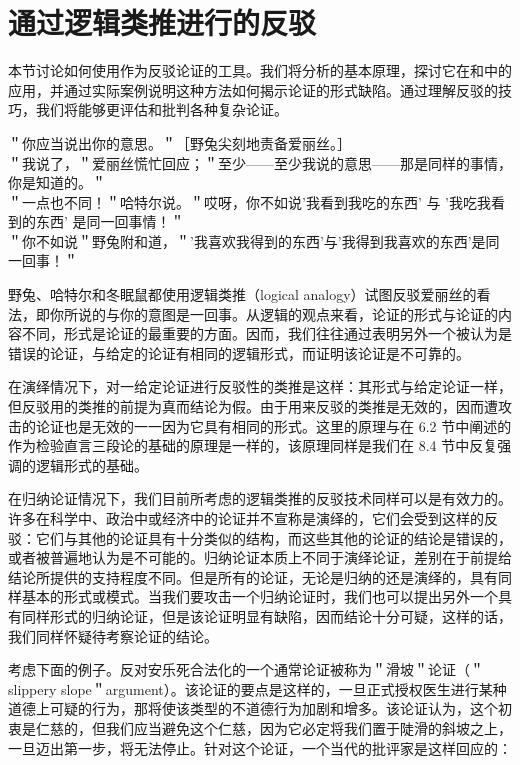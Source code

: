 \section{通过逻辑类推进行的反驳}

\begin{logicbox}[title=引言]
本节讨论如何使用作为反驳论证的工具。我们将分析的基本原理，探讨它在和中的应用，并通过实际案例说明这种方法如何揭示论证的形式缺陷。通过理解反驳的技巧，我们将能够更评估和批判各种复杂论证。
\end{logicbox}

＂你应当说出你的意思。＂［野兔尖刻地责备爱丽丝。］\\
＂我说了，＂爱丽丝慌忙回应；＂至少——至少我说的意思——那是同样的事情，你是知道的。＂\\
＂一点也不同！＂哈特尔说。＂哎呀，你不如说'我看到我吃的东西' 与 '我吃我看到的东西' 是同一回事情！＂\\
＂你不如说＂野兔附和道，＂'我喜欢我得到的东西'与'我得到我喜欢的东西'是同一回事！＂

野兔、哈特尔和冬眠鼠都使用逻辑类推（logical analogy）试图反驳爱丽丝的看法，即你所说的与你的意图是一回事。从逻辑的观点来看，论证的形式与论证的内容不同，形式是论证的最重要的方面。因而，我们往往通过表明另外一个被认为是错误的论证，与给定的论证有相同的逻辑形式，而证明该论证是不可靠的。

在演绎情况下，对一给定论证进行反驳性的类推是这样：其形式与给定论证一样，但反驳用的类推的前提为真而结论为假。由于用来反驳的类推是无效的，因而遭攻击的论证也是无效的一一因为它具有相同的形式。这里的原理与在 6.2 节中阐述的作为检验直言三段论的基础的原理是一样的，该原理同样是我们在 8.4 节中反复强调的逻辑形式的基础。

在归纳论证情况下，我们目前所考虑的逻辑类推的反驳技术同样可以是有效力的。许多在科学中、政治中或经济中的论证并不宣称是演绎的，它们会受到这样的反驳：它们与其他的论证具有十分类似的结构，而这些其他的论证的结论是错误的，或者被普遍地认为是不可能的。归纳论证本质上不同于演绎论证，差别在于前提给结论所提供的支持程度不同。但是所有的论证，无论是归纳的还是演绎的，具有同样基本的形式或模式。当我们要攻击一个归纳论证时，我们也可以提出另外一个具有同样形式的归纳论证，但是该论证明显有缺陷，因而结论十分可疑，这样的话，我们同样怀疑待考察论证的结论。

考虑下面的例子。反对安乐死合法化的一个通常论证被称为＂滑坡＂论证（＂slippery slope＂argument）。该论证的要点是这样的，一旦正式授权医生进行某种道德上可疑的行为，那将使该类型的不道德行为加剧和增多。该论证认为，这个初衷是仁慈的，但我们应当避免这个仁慈，因为它必定将我们置于陡滑的斜坡之上，一旦迈出第一步，将无法停止。针对这个论证，一个当代的批评家是这样回应的：

